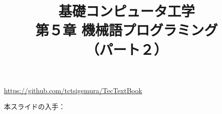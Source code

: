 \documentclass[handout]{beamer}        %
\begin{document}
\title{基礎コンピュータ工学\\第５章 機械語プログラミング\\（パート２）}
\date{}

\begin{frame}
  \titlepage
  \centerline{\url{https://github.com/tctsigemura/TecTextBook}}
  \vfill
  \centerline{本スライドの入手：
    }
\end{frame}

\end{document}

